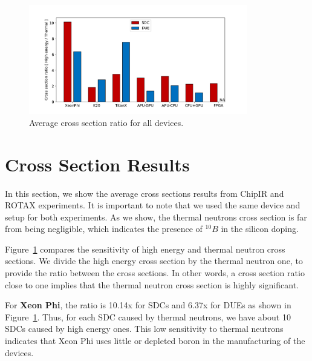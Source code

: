 %

\begin{figure}[th]
	\centering
	\includegraphics[width=0.85\textwidth]{./figs/cross_section_ratio.pdf}
	\caption{Average cross section ratio for all devices.}
	\label{cs_ratio}
\end{figure}

\section{Cross Section Results}
\label{sec_results}

In this section, we show the average cross sections results from ChipIR and ROTAX experiments. It is important to note that we used the same device and setup for both experiments. As we show, the thermal neutrons cross section is far from being negligible, which indicates the presence of $^{10}B$ in the silicon doping.

Figure~\ref{cs_ratio} compares the sensitivity of high energy and thermal neutron cross sections. We divide the high energy cross section by the thermal neutron one, to provide the ratio between the cross sections. In other words, a cross section ratio close to one implies that the thermal neutron cross section is highly significant.

For \textbf{Xeon Phi}, the ratio is 10.14x for SDCs and 6.37x for DUEs as shown in Figure~\ref{cs_ratio}. Thus, for each SDC caused by thermal neutrons, we have about 10 SDCs caused by high energy ones. This low sensitivity to thermal neutrons indicates that Xeon Phi uses little or depleted boron in the manufacturing of the devices.

